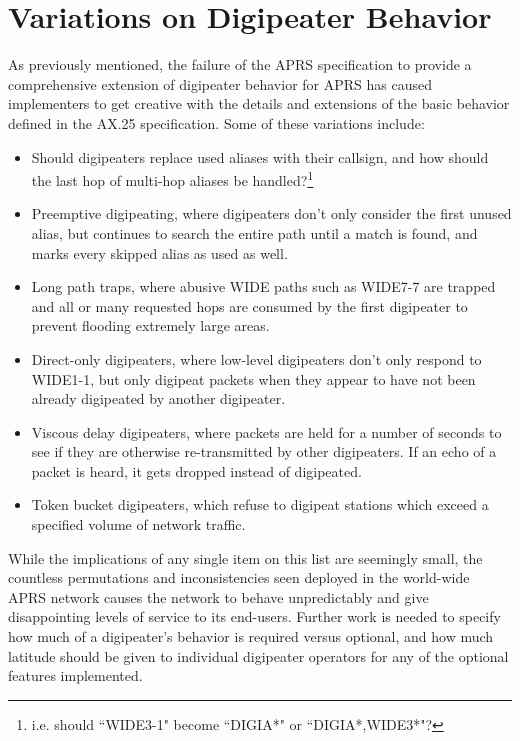 \section{Variations on Digipeater Behavior}

As previously mentioned, the failure of the APRS specification to provide
a comprehensive extension of digipeater behavior for APRS has caused
implementers to get creative with the details and extensions of
the basic behavior defined in the AX.25 specification.
Some of these variations include:
\begin{itemize}
	\item Should digipeaters replace used aliases with their callsign, and
		how should the last hop of multi-hop aliases be handled?\footnote{i.e.
		should ``WIDE3-1" become ``DIGIA*" or ``DIGIA*,WIDE3*"?}
	\item Preemptive digipeating, where digipeaters don't only consider the
		first unused alias, but continues to search the entire path
		until a match is found, and marks every skipped alias as used as well.
	\item Long path traps, where abusive WIDE paths such as WIDE7-7 are trapped
		and all or many requested hops are consumed by the first digipeater
		to prevent flooding extremely large areas.
	\item Direct-only digipeaters, where low-level digipeaters don't only respond
		to WIDE1-1, but only digipeat packets when they appear to have not
		been already digipeated by another digipeater.
	\item Viscous delay digipeaters, where packets are held for a number of
		seconds to see if they are otherwise re-transmitted by other digipeaters.
		If an echo of a packet is heard, it gets dropped instead of digipeated.
	\item Token bucket digipeaters, which refuse to digipeat stations which
		exceed a specified volume of network traffic.
\end{itemize}

While the implications of any single item on this list are seemingly small,
the countless permutations and inconsistencies seen deployed in the
world-wide APRS network causes the network to behave unpredictably and
give disappointing levels of service to its end-users.
Further work is needed to specify how much of a digipeater's behavior is
required versus optional, and how much latitude should be given to individual
digipeater operators for any of the optional features implemented.

